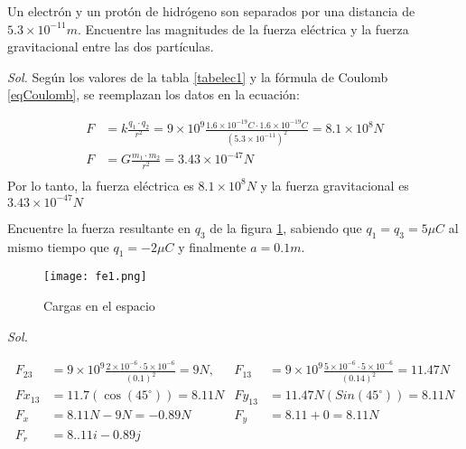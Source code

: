 \begin{example}
	Un electrón y un protón de hidrógeno son separados por una distancia de
	$ 5{.}3\times 10^{-11}m$. Encuentre las magnitudes de la fuerza eléctrica y la fuerza gravitacional entre las dos partículas.
\end{example}


\textit{ Sol. } Según los valores de la tabla \ref{tabelec1} y la fórmula de Coulomb \eqref{eqCoulomb}, se reemplazan los datos en la ecuación:

\begin{align*}
	F & = k\frac{q_{1}\cdot q_{2}}{r^2 } =9\times 10^9\frac{1{.}6\times10^{-19} C\cdot 1{.}6\times10^{-19} C}{(5{.}3 \times10^{-11})^2 }= 8{.}1\times10^8N \\
	F & = G\frac{m_{1}\cdot m_{2}}{r^2 }=3{.}43\times10^{-47}N                                                                                             \\
\end{align*}
Por lo tanto, la fuerza eléctrica es $8{.}1\times 10^8N$ y la fuerza gravitacional es $3{.}43\times 10^{-47}N$

\begin{example}
	Encuentre la fuerza resultante en $q_3$ de la figura \ref{fe1}, sabiendo que $q_{1}= q_{3} = 5\mu C$ al mismo
	tiempo que $q_{1}= -2\mu C$ y finalmente $a =0{.}1m$.

	\begin{figure}[h!]
		\centerline{\texttt{[image: fe1.png]}}
		\caption{Cargas en el espacio}
		\label{fe1}
	\end{figure}
\end{example}

\textit{ Sol. }

\begin{align*}
	F_{23}  & = 9\times 10^9\frac{2\times10^{-6}\cdot 5\times10^{-6}}{(0.1)^2 } = 9N, & F_{13}  & = 9\times 10^9\frac{5\times10^{-6}\cdot 5\times10^{-6}}{(0{.}14)^2 } = 11{.}47N \\
	Fx_{13} & = 11{.}7(\cos(45^{\circ}))= 8{.}11N                                     & Fy_{13} & = 11{.}47N(Sin(45^{\circ}))= 8.11N                                              \\
	F_{x}   & = 8{.}11N -9N = -0{.}89N                                                & F_{y}   & = 8{.}11 +0 = 8{.}11N                                                           \\
	F_{r}   & = 8{.}.11i - 0{.}89j
\end{align*}


